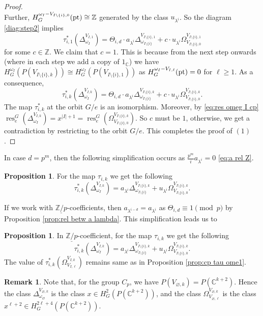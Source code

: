 \documentclass[a4paper,leqno,11pt]{amsart}
\theoremstyle{plain}
\theoremstyle{definition}
\newtheorem{prop}[theorem]{Proposition}
\newtheorem{rmk}[theorem]{Remark}
\theoremstyle{remark}
\theoremstyle{definition}
\newcommand{\C}{{\mathbb C}}
\newcommand{\Z}{{\mathbb{Z}}}
\newcommand{\res}{\mathit{res}}
\def\Z{\mathbb{Z}}
\def\C{\mathbb{C}}
\numberwithin{equation}{section}
\newcommand{\Zp}{\underline{{\mathbb Z}/p}}
\newcommand{\pt}{\textup{pt}}
\renewcommand{\res}{\operatorname{res}}
\begin{document}
\begin{proof}
\[		\] 
		Further, $ H^{\omega _I-{V_{I\setminus \{i\},0}}}_G(\pt) \cong  \Z$ generated by the class $u_{\lambda^i}$.  So  the diagram \eqref{diag:step2} implies
		\[
		\tau_{i,1}^*(\Delta^{V_{I,1}}_{\omega _I})=\Theta_{i,d}\cdot a_{\lambda^i} \Delta_{\omega_{I\setminus\{ i\}} }^{V_{I\setminus \{i\},1}}+c \cdot u_{\lambda^i}\Omega_{V_{I\setminus\{ i\},0} }^{V_{I\setminus \{i\},1}}
		\]
		for some $ c\in \Z $. We claim that $ c=1$. This is because from the next step onwards (where in each step we add a copy of $ 1_\C $) we have 
		$ H^{\omega _I}_G(P(V_{I\setminus\{ i\},k}))\cong H^{\omega _I}_G(P(V_{I\setminus\{ i\},1})) $ as $ H^{\omega _I-{V_{I,\ell}}}_G(\pt )=0 $ for $ \ell\ge 1 $. As a consequence, 
		\[
		\tau_{i,k}^*(\Delta^{V_{I,k}}_{\omega _I})=\Theta_{i,d}\cdot a_{\lambda^i} \Delta_{\omega_{I\setminus\{ i\}} }^{V_{I\setminus \{i\},k}}+c \cdot u_{\lambda^i}\Omega_{V_{I\setminus\{ i\},0} }^{V_{I\setminus \{i\},k}}.
		\]
		The map $ \tau _{i,k}^* $ at the orbit $ G/e $ is an isomorphism. Moreover,  by \eqref{eq:res omeg I cp} $ \res_e^G(\Delta_{\omega _I}^{V_{I,k}}) =x^{|I|+1}=\res_e^G(\Omega_{V_{I\setminus\{ i\},0} }^{V_{I\setminus \{i\},k}}). $ So $ c $ must be $ 1$, otherwise, we get  a contradiction by restricting to the orbit $ G/e $. This completes the proof of $ (1) $. 
	\end{proof}
	In case $ d=p^m $, then the following simplification occurs as $\frac{p^m}{i}a_{\lambda^i}=0$ \eqref{eq:a rel Z}. 
	\begin{prop}\label{prop:cp tau ome3} For the map $ \tau _{i,k} $ we get the following 
		\[
		\tau_{i,k}^*(\Delta^{V_{I,k}}_{\omega _I})=a_{\lambda^i} \Delta_{\omega_{I\setminus\{ i\}} }^{V_{I\setminus \{i\},k}}+u_{\lambda^i}\Omega_{V_{I\setminus\{ i\},0} }^{V_{I\setminus \{i\},k}}. 
		\]
	\end{prop}
	If we work with  $ \Zp $-coefficients, then $ a_{\lambda^{i-d}} =  a_{\lambda^i} $ as  $ \Theta_{i,d}\equiv 1 \pmod p$ by Proposition \eqref{prop:rel betw a lambda}. This simplification leads us to  
	\begin{prop}\label{prop:cp tau ome2} In $ \Zp $-coefficient, for the map $ \tau _{i,k} $ we get the following 
		\[
		\tau_{i,k}^*(\Delta^{V_{I,k}}_{\omega _I})= a_{\lambda^i} \Delta_{\omega_{I\setminus\{ i\}} }^{V_{I\setminus \{i\},k}}+u_{\lambda^i}\Omega_{V_{I\setminus\{ i\},0} }^{V_{I\setminus \{i\},k}}. 
		\]
		The value of $ \tau_{i,k}^*(\Omega^{V_{I,k}}_{V_{I,\ell} })$ remains same as in Proposition \ref{prop:cp tau ome1}.
	\end{prop}
	\begin{rmk}\label{rmk:cp empty case}
		Note that, for the group $ C_p $, we have $ P({V_{\varnothing,k}})=P(\C^{k+2})$. Hence the class $ \Delta^{V_{\varnothing,k}}_{\omega _\varnothing} $ is the class $ x\in H^{2}_G(P(\C^{k+2}))  $, and the class $ \Omega^{V_{\varnothing,k}}_{V_{\varnothing,\ell}}$ is the class $ x^{\ell+2} \in H^{2\ell+4}_G(P(\C^{k+2})) $.
	\end{rmk}
\end{document}
